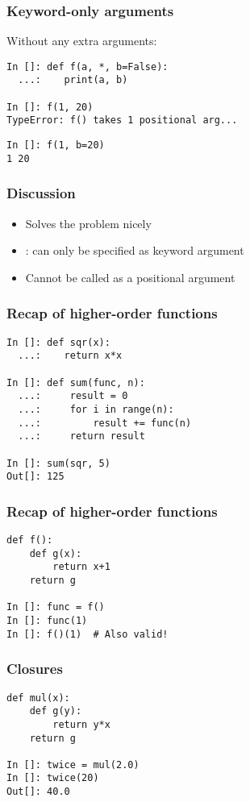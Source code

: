 \documentclass[14pt,compress]{beamer}
\begin{document}
\begin{frame}[fragile]
  \frametitle{Keyword-only arguments}
 \noindent Without any extra arguments:
\vspace*{0.25in}
  \begin{lstlisting}
In []: def f(a, *, b=False):
  ...:    print(a, b)

In []: f(1, 20)
TypeError: f() takes 1 positional arg...
\end{lstlisting}
\pause
  \begin{lstlisting}
In []: f(1, b=20)
1 20
  \end{lstlisting}
\end{frame}

\begin{frame}
  \frametitle{Discussion}
  \begin{itemize}
  \item Solves the problem nicely
  \item {}: can only be specified as keyword argument

  \item Cannot be called as a positional argument
  \end{itemize}
\end{frame}

\begin{frame}[fragile]
  \frametitle{Recap of higher-order functions}
  \begin{lstlisting}
In []: def sqr(x):
  ...:    return x*x

In []: def sum(func, n):
  ...:     result = 0
  ...:     for i in range(n):
  ...:         result += func(n)
  ...:     return result

In []: sum(sqr, 5)
Out[]: 125
  \end{lstlisting}
\end{frame}

\begin{frame}[fragile]
  \frametitle{Recap of higher-order functions}
  \begin{lstlisting}
def f():
    def g(x):
        return x+1
    return g

In []: func = f()
In []: func(1)
In []: f()(1)  # Also valid!
  \end{lstlisting}
\end{frame}


\begin{frame}[fragile]
  \frametitle{Closures}
  \begin{lstlisting}
def mul(x):
    def g(y):
        return y*x
    return g

In []: twice = mul(2.0)
In []: twice(20)
Out[]: 40.0
  \end{lstlisting}
\end{frame}
\end{document}
